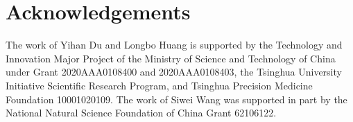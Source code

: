 \documentclass{article} %
\newcommand{\OnlyInFull}[1]{}
\newcommand{\OnlyInFull}[1]{#1}%
\begin{document}
	\section*{Acknowledgements}
	
	The work of Yihan Du and Longbo Huang is supported by the Technology and Innovation Major Project of the Ministry of Science and Technology of China under Grant 2020AAA0108400 and 2020AAA0108403, the Tsinghua University Initiative Scientific Research Program, and Tsinghua Precision Medicine Foundation 10001020109.
	The work of Siwei Wang was supported in part by the National Natural Science Foundation of China Grant 62106122.
	
	
	
	
	
	\OnlyInFull{
		\clearpage
		
	}
	
\end{document}
